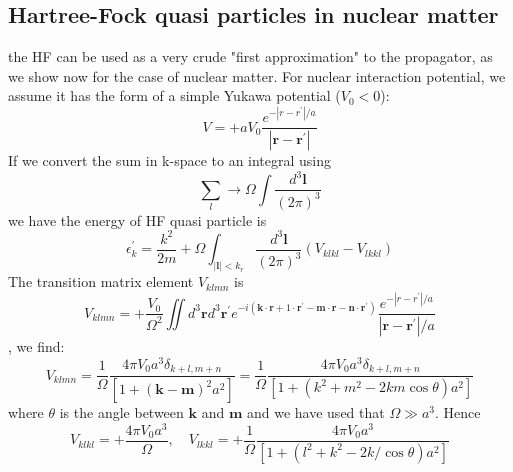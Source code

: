 \subsection{Hartree-Fock quasi particles in nuclear matter}
the HF can be used as a very crude "first approximation" to the propagator, as we show now for the case of nuclear matter.  For nuclear interaction potential, we assume it has the form of a simple Yukawa potential ($V_0<0$):
\begin{equation}V=+a V_{0} \frac{e^{-\left|r-r^{\prime}\right| / a}}{\left|\mathbf{r}-\mathbf{r}^{\prime}\right|}
\label{Yukawa-potential}
\end{equation}
If we convert the sum in k-space to an integral using
\begin{equation}\sum_{l} \rightarrow \Omega \int \frac{d^{3} \mathbf{l}}{(2 \pi)^{3}}\end{equation}
we have the energy of HF quasi particle is
\begin{equation}\epsilon_{k}^{\prime}=\frac{k^{2}}{2 m}+\Omega \int_{|\mathbf{l}|<k_{r}} \frac{d^{3} \mathbf{l}}{(2 \pi)^{3}}\left(V_{k l k l}-V_{l k k l}\right)
\label{nuclear-quasi-energy}
\end{equation}
The transition matrix element $V_{klmn}$ is
\begin{equation}V_{k l m n}=+\frac{V_{0}}{\Omega^{2}} \iint d^{3} \mathbf{r} d^{3} \mathbf{r}^{\prime} e^{-i\left(\mathbf{k} \cdot \mathbf{r}+1 \cdot \mathbf{r}^{\prime}-\mathbf{m} \cdot \mathbf{r}-\mathbf{n} \cdot \mathbf{r}^{\prime}\right)} \frac{e^{-\left|r-r^{\prime}\right| / a}}{\left|\mathbf{r}-\mathbf{r}^{\prime}\right| / a}\end{equation}
, we find:
\begin{equation}
V_{klmn}=\frac{1}{\Omega} \frac{4 \pi V_{0} a^{3} \delta_{k+l, m+n}}{\left[1+(\mathbf{k}-\mathbf{m})^{2} a^{2}\right]}=\frac{1}{\Omega} \frac{4 \pi V_{0} a^{3} \delta_{k+l, m+n}}{\left[1+\left(k^{2}+m^{2}-2 k m \cos \theta\right) a^{2}\right]}
\label{Yukawa-transition-element}
\end{equation}
where $\theta$ is the angle between $\mathbf{k}$ and $\mathbf{m}$ and we have used that $\Omega \gg a^{3} .$ Hence
\begin{equation}V_{k l k l}=+\frac{4 \pi V_{0} a^{3}}{\Omega}, \quad V_{l k k l}=+\frac{1}{\Omega} \frac{4 \pi V_{0} a^{3}}{\left[1+\left(l^{2}+k^{2}-2 k / \cos \theta\right) a^{2}\right]}\end{equation}
